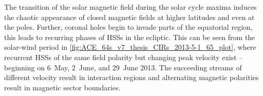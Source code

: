 The transition of the solar magnetic field during the solar cycle maxima induces the chaotic appearance of closed magnetic fields at higher latitudes and even at the poles. Further, coronal holes begin to invade parts of the equatorial region, this leads to recurring phases of HSSs in the ecliptic. This can be seen from the solar-wind period in \autoref{fig:ACE_64s_v7_thesis_CIRs_2013-5-1_65_plot}, where recurrent HSSs of the same field polarity but changing peak velocity exist -- beginning on 6~May, 2~June, and 29~June 2013. The succeeding streams of different velocity result in interaction regions and alternating magnetic polarities result in magnetic sector boundaries.


